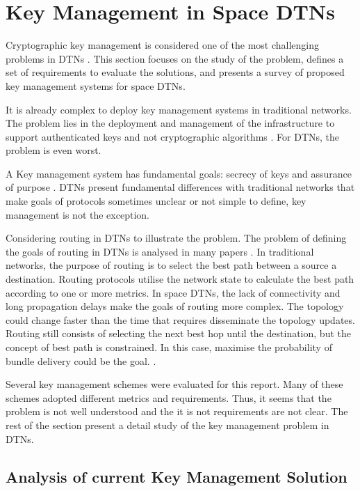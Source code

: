 \section{Key Management in Space DTNs}
\label{sec:survey}

Cryptographic key management is considered one of the most challenging problems in DTNs \cite{menesidou2016automated,menesidou2017cryptographic,ivancic2009security,asokan2007towards}. This section focuses on the study of the problem, defines a set of requirements to evaluate the solutions, and presents a survey of proposed key management systems for space DTNs.


It is already complex to deploy key management systems in traditional networks. The problem lies in the deployment and management of the infrastructure to support authenticated keys and not cryptographic algorithms \cite{al2003certificateless}. For DTNs, the problem is even worst.

A Key management system has fundamental goals: secrecy of keys and assurance of purpose \cite{martineveryday}.  DTNs present fundamental differences with traditional networks that make goals of protocols sometimes unclear or not simple to define, key management is not the exception.

Considering routing in DTNs to illustrate the problem. The problem of defining the goals of routing in DTNs is analysed in many papers \cite{ivancic2009security,fall2003delay,araniti2015contact}. In traditional networks, the purpose of routing is to select the best path between a source a destination. Routing protocols utilise the network state to calculate the best path according to one or more metrics. In space DTNs, the lack of connectivity and long propagation delays make the goals of routing more complex. The topology could change faster than the time that requires disseminate the topology updates. Routing still consists of selecting the next best hop until the destination, but the concept of best path is constrained. In this case, maximise the probability of bundle delivery could be the goal. \cite{araniti2015contact}. 


Several key management schemes were evaluated for this report. Many of these schemes adopted different metrics and requirements. Thus, it seems that the problem is not well understood and the it is not requirements are not clear. The rest of the section present a detail study of the key management problem in DTNs.

\subsection{Analysis of current Key Management Solution}


